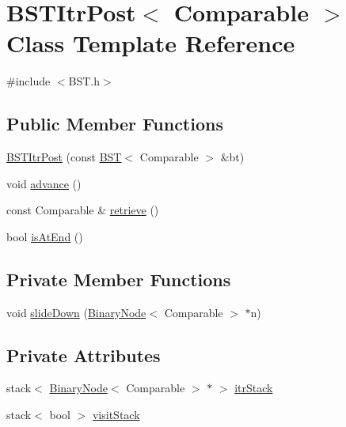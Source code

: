 \hypertarget{classBSTItrPost}{}\section{B\+S\+T\+Itr\+Post$<$ Comparable $>$ Class Template Reference}
\label{classBSTItrPost}


{\ttfamily \#include $<$B\+S\+T.\+h$>$}

\subsection*{Public Member Functions}
\begin{DoxyCompactItemize}
\item 
\hyperlink{classBSTItrPost_acf7e537dea01978f40c40909c55c56c2}{B\+S\+T\+Itr\+Post} (const \hyperlink{classBST}{B\+ST}$<$ Comparable $>$ \&bt)
\item 
void \hyperlink{classBSTItrPost_a376098e5a82cd02118dd4dcdec49bb26}{advance} ()
\item 
const Comparable \& \hyperlink{classBSTItrPost_a1e9f3953f7ae5712bf3c7c6d05059718}{retrieve} ()
\item 
bool \hyperlink{classBSTItrPost_a2f330e73bb817e8bd1c797805e66ddb7}{is\+At\+End} ()
\end{DoxyCompactItemize}
\subsection*{Private Member Functions}
\begin{DoxyCompactItemize}
\item 
void \hyperlink{classBSTItrPost_a56a13ae3a0358eeb06a83d4de745344a}{slide\+Down} (\hyperlink{classBinaryNode}{Binary\+Node}$<$ Comparable $>$ $\ast$n)
\end{DoxyCompactItemize}
\subsection*{Private Attributes}
\begin{DoxyCompactItemize}
\item 
stack$<$ \hyperlink{classBinaryNode}{Binary\+Node}$<$ Comparable $>$ $\ast$ $>$ \hyperlink{classBSTItrPost_add32204909b8a6c3635b926832192ced}{itr\+Stack}
\item 
stack$<$ bool $>$ \hyperlink{classBSTItrPost_a5a9af907c7b135acdf3b5ed9affbb9a7}{visit\+Stack}
\end{DoxyCompactItemize}


